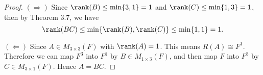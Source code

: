 \begin{Exercise}
\begin{proof}
$(\Longrightarrow)$
Since $\rank(B)\leq \min\{3,1\} = 1$ and $\rank(C)\leq \min\{1,3\} = 1$, then by Theorem 3.7, we have 
$$
\rank(BC)\leq \min\{\rank(B), \rank(C)\} \leq \min\{1,1\} = 1.
$$

\vspace{2ex}

$(\Longleftarrow)$
Since $A\in M_{3\times 3}(F)$ with $\rank(A) = 1$. This means $R(A)\cong F^1$. Therefore we can map $F^3$ into $F^1$ by $B\in M_{1\times 3}(F)$, and then map $F$ into $F^3$ by $C\in M_{3\times 1}(F)$. Hence $A=BC$.
\end{proof}
\end{Exercise}